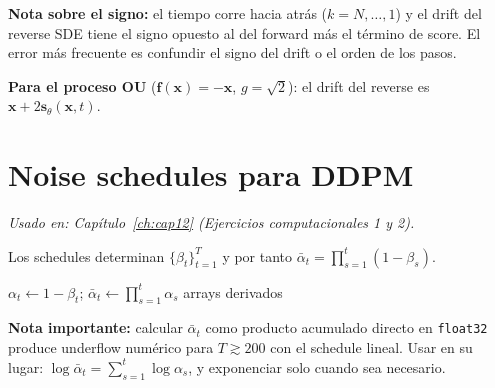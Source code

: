 \noindent\textbf{Nota sobre el signo:} el tiempo corre hacia atrás ($k=N,\ldots,1$)
y el drift del reverse SDE tiene el signo opuesto al del forward más el término
de score. El error más frecuente es confundir el signo del drift o el orden de
los pasos.

\noindent\textbf{Para el proceso OU} ($\bm{f}(\bm{x}) = -\bm{x}$, $g = \sqrt{2}$):
el drift del reverse es $\bm{x} + 2\bm{s}_\theta(\bm{x},t)$.

\section{Noise schedules para DDPM}
\label{sec:ap_schedules}

\textit{Usado en: Capítulo~\ref{ch:cap12} (Ejercicios computacionales 1 y 2).}

\medskip
Los schedules determinan $\{\beta_t\}_{t=1}^T$ y por tanto
$\bar{\alpha}_t = \prod_{s=1}^t(1-\beta_s)$.

\begin{algorithm}[H]
\caption{Noise schedules lineales y coseno}
\label{alg:ap_schedule}

$\alpha_t \leftarrow 1 - \beta_t$;
$\bar\alpha_t \leftarrow \prod_{s=1}^t\alpha_s$
\Return arrays derivados\;
\end{algorithm}

\noindent\textbf{Nota importante:} calcular $\bar\alpha_t$ como producto
acumulado directo en \texttt{float32} produce underflow numérico para
$T\gtrsim 200$ con el schedule lineal. Usar en su lugar:
$\log\bar\alpha_t = \sum_{s=1}^t\log\alpha_s$, y exponenciar solo cuando
sea necesario.

